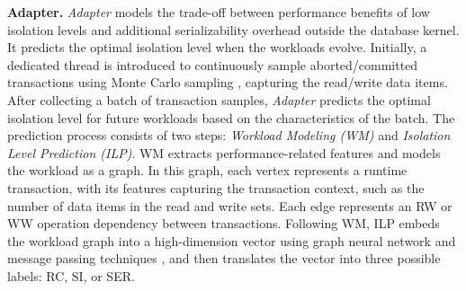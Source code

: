 {%

\noindent\textbf{Adapter.} \textit{Adapter} models the trade-off between performance benefits of low isolation levels and additional serializability overhead outside the database kernel. It predicts the optimal isolation level when the workloads evolve. Initially, a dedicated thread is introduced to continuously sample aborted/committed transactions using Monte Carlo sampling \cite{DBLP:journals/entropy/ZhouJLWLG24}, capturing the read/write data items. 
After collecting a batch of transaction samples, \textit{Adapter} predicts the optimal isolation level for future workloads based on the characteristics of the batch. The prediction process consists of two steps: \textit{Workload Modeling (WM)} and \textit{Isolation Level Prediction (ILP)}. 
WM extracts performance-related features and models the workload as a graph.
In this graph, each vertex represents a runtime transaction, with its features capturing the transaction context, such as the number of data items in the read and write sets.
Each edge represents an RW or WW operation dependency between transactions.
Following WM, ILP embeds the workload graph into a high-dimension vector using graph neural network \cite{DBLP:journals/corr/BrunaZSL13} and message passing techniques \cite{DBLP:conf/icml/GilmerSRVD17}, and then translates the vector into three possible labels: RC, SI, or SER. 
}
